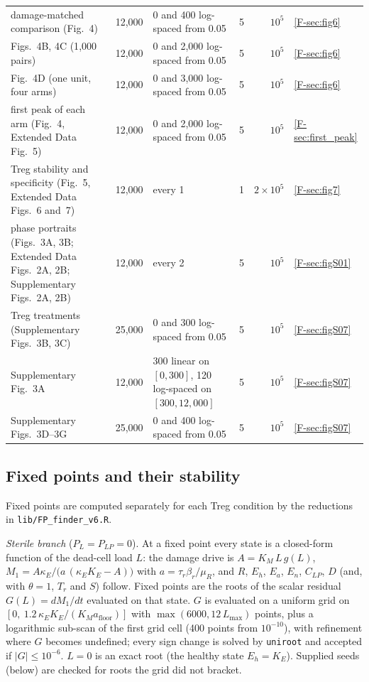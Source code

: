 \documentclass[11pt]{article}
\begin{document}
\begin{table}[H]
\begin{tabularx}{\linewidth}{@{}L l L r r l@{}}
damage-matched comparison (Fig.~4) & 12{,}000 & 0 and 400 log-spaced from 0.05 & 5 & $10^{5}$ & \ref{F-sec:fig6}\\
Figs.~4B, 4C (1{,}000 pairs) & 12{,}000 & 0 and 2{,}000 log-spaced from 0.05 & 5 & $10^{5}$ & \ref{F-sec:fig6}\\
Fig.~4D (one unit, four arms) & 12{,}000 & 0 and 3{,}000 log-spaced from 0.05 & 5 & $10^{5}$ & \ref{F-sec:fig6}\\
first peak of each arm (Fig.~4, Extended Data Fig.~5) & 12{,}000 & 0 and 2{,}000 log-spaced from 0.05 & 5 & $10^{5}$ & \ref{F-sec:first_peak}\\
Treg stability and specificity (Fig.~5, Extended Data Figs.~6 and~7) & 12{,}000 & every 1 & 1 & $2\times10^{5}$ & \ref{F-sec:fig7}\\
phase portraits (Figs.~3A, 3B; Extended Data Figs.~2A, 2B; Supplementary Figs.~2A, 2B) & 12{,}000 & every 2 & 5 & $10^{5}$ & \ref{F-sec:figS01}\\
Treg treatments (Supplementary Figs.~3B, 3C) & 25{,}000 & 0 and 300 log-spaced from 0.05 & 5 & $10^{5}$ & \ref{F-sec:figS07}\\
Supplementary Fig.~3A & 12{,}000 & 300 linear on $[0,300]$, 120 log-spaced on $[300, 12{,}000]$ & 5 & $10^{5}$ & \ref{F-sec:figS07}\\
Supplementary Figs.~3D--3G & 25{,}000 & 0 and 400 log-spaced from 0.05 & 5 & $10^{5}$ & \ref{F-sec:figS07}\\
\bottomrule
\end{tabularx}
\end{table}

\subsection{Fixed points and their stability}
\label{sec:fp}

Fixed points are computed separately for each Treg condition by the reductions in
\texttt{lib/FP\_finder\_v6.R}.

\emph{Sterile branch} ($P_L = P_{LP} = 0$). At a fixed point every state is a closed-form
function of the dead-cell load $L$: the damage drive is $A = K_M\,L\,g(L)$,
$M_1 = A\kappa_E / \big(a\,(\kappa_E K_E - A)\big)$ with $a = \tau_r\beta_r/\mu_R$,
and $R$, $E_h$, $E_a$, $E_n$, $C_{LP}$, $D$ (and, with $\theta = 1$, $T_r$ and $S$) follow.
Fixed points are the roots of the scalar residual $G(L) = dM_1/dt$ evaluated on that
state. $G$ is evaluated on a uniform grid on
$[0,\ 1.2\,\kappa_E K_E/(K_M a_{\mathrm{floor}})]$ with $\max(6000, 12\,L_{\max})$ points,
plus a logarithmic sub-scan of the first grid cell (400 points from $10^{-10}$), with
refinement where $G$ becomes undefined; every sign change is solved by
\texttt{uniroot} and accepted if $|G| \le 10^{-6}$. $L = 0$ is an exact root (the healthy
state $E_h = K_E$). Supplied seeds (below) are checked for roots the grid did not bracket.
\end{document}
